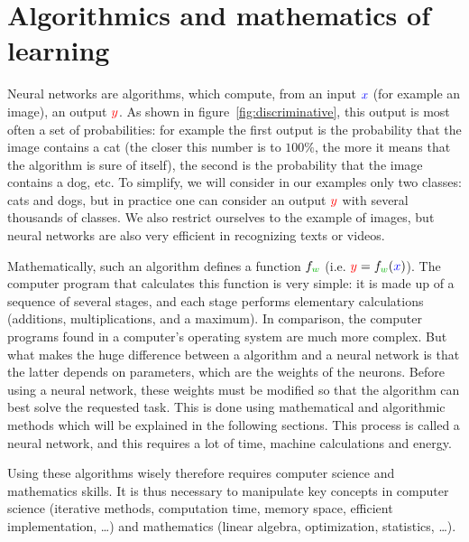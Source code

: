 
\section{Algorithmics and mathematics of learning}

Neural networks are algorithms, which compute, from an input $\myblue{x}$ (for example an image), an output ${\color{red} y}$. As shown in figure~\ref{fig:discriminative}, this output is most often a set of probabilities: for example the first output is the probability that the image contains a cat (the closer this number is to $100\%$, the more it means that the algorithm is sure of itself), the second is the probability that the image contains a dog, etc.
%
To simplify, we will consider in our examples only two classes: cats and dogs, but in practice one can consider an output ${\color{red} y}$ with several thousands of classes. We also restrict ourselves to the example of images, but neural networks are also very efficient in recognizing texts or videos.

Mathematically, such an algorithm defines a function $f_{\mygreen{w}}$ (i.e. ${\color{red} y} = f_{\mygreen{w}}({\color{blue}x})$). The computer program that calculates this function is very simple: it is made up of a sequence of several stages, and each stage performs elementary calculations (additions, multiplications, and a maximum).
%
In comparison, the computer programs found in a computer's operating system are much more complex.
%
But what makes the huge difference between a  algorithm and a neural network is that the latter depends on parameters, which are the weights of the neurons. Before using a neural network, these weights must be modified so that the algorithm can best solve the requested task. This is done using mathematical and algorithmic methods which will be explained in the following sections. This process is called  a neural network, and this requires a lot of time, machine calculations and energy.

Using these algorithms wisely therefore requires computer science and mathematics skills. It is thus necessary to manipulate  key concepts in computer science (iterative methods, computation time, memory space, efficient implementation, \ldots) and mathematics (linear algebra, optimization, statistics, \ldots).

